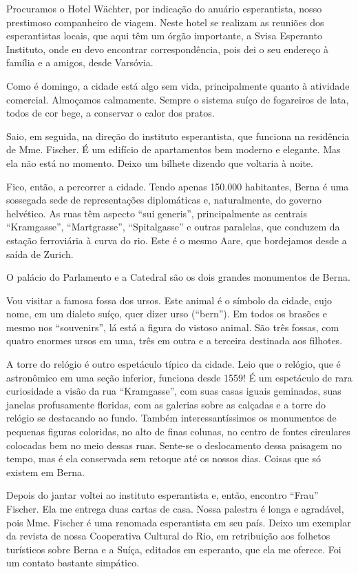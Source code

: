 Procuramos o Hotel Wächter, por indicação do anuário esperantista, nosso prestimoso companheiro de viagem. Neste hotel se realizam as reuniões dos esperantistas locais, que aqui têm um órgão importante, a Svisa Esperanto Instituto, onde eu devo encontrar correspondência, pois dei o seu endereço à família e a amigos, desde Varsóvia.

Como é domingo, a cidade está algo sem vida, principalmente quanto à atividade comercial. Almoçamos calmamente. Sempre o sistema suíço de fogareiros de lata, todos de cor bege, a conservar o calor dos pratos.

Saio, em seguida, na direção do instituto esperantista, que funciona na residência de Mme. Fischer. É um edifício de apartamentos bem moderno e elegante. Mas ela não está no momento. Deixo um bilhete dizendo que voltaria à noite.

Fico, então, a percorrer a cidade. Tendo apenas 150.000 habitantes, Berna é uma sossegada sede de representações diplomáticas e, naturalmente, do governo helvético. As ruas têm aspecto ``sui generis'', principalmente as centrais ``Kramgasse'', ``Martgrasse'', ``Spitalgasse'' e outras paralelas, que conduzem da estação ferroviária à curva do rio. Este é o mesmo Aare, que bordejamos desde a saída de Zurich.

O palácio do Parlamento e a Catedral são os dois grandes monumentos de Berna.

Vou visitar a famosa fossa dos ursos. Este animal é o símbolo da cidade, cujo nome, em um dialeto suíço, quer dizer urso (``bern''). Em todos os brasões e mesmo nos ``souvenirs'', lá está a figura do vistoso animal. São três fossas, com quatro enormes ursos em uma, três em outra e a terceira destinada aos filhotes.

A torre do relógio é outro espetáculo típico da cidade. Leio que o relógio, que é astronômico em uma seção inferior, funciona desde 1559! É um espetáculo de rara curiosidade a visão da rua ``Kramgasse'', com suas casas iguais geminadas, suas janelas profusamente floridas, com as galerias sobre as calçadas e a torre do relógio se destacando ao fundo. Também interessantíssimos os monumentos de pequenas figuras coloridas, no alto de finas colunas, no centro de fontes circulares colocadas bem no meio dessas ruas. Sente-se o deslocamento dessa paisagem no tempo, mas é ela conservada sem retoque até os nossos dias. Coisas que só existem em Berna.

Depois do jantar voltei ao instituto esperantista e, então, encontro ``Frau'' Fischer. Ela me entrega duas cartas de casa. Nossa palestra é longa e agradável, pois Mme. Fischer é uma renomada esperantista em seu país. Deixo um exemplar da revista de nossa Cooperativa Cultural do Rio, em retribuição aos folhetos turísticos sobre Berna e a Suíça, editados em esperanto, que ela me oferece. Foi um contato bastante simpático.

